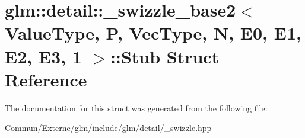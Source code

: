 \hypertarget{structglm_1_1detail_1_1__swizzle__base2_3_01_value_type_00_01_p_00_01_vec_type_00_01_n_00_01_e0_17279995be88bc842083eed40758473c}{}\section{glm\+:\+:detail\+:\+:\+\_\+swizzle\+\_\+base2$<$ Value\+Type, P, Vec\+Type, N, E0, E1, E2, E3, 1 $>$\+:\+:Stub Struct Reference}
\label{structglm_1_1detail_1_1__swizzle__base2_3_01_value_type_00_01_p_00_01_vec_type_00_01_n_00_01_e0_17279995be88bc842083eed40758473c}


The documentation for this struct was generated from the following file\+:\begin{DoxyCompactItemize}
\item 
Commun/\+Externe/glm/include/glm/detail/\+\_\+swizzle.\+hpp\end{DoxyCompactItemize}
